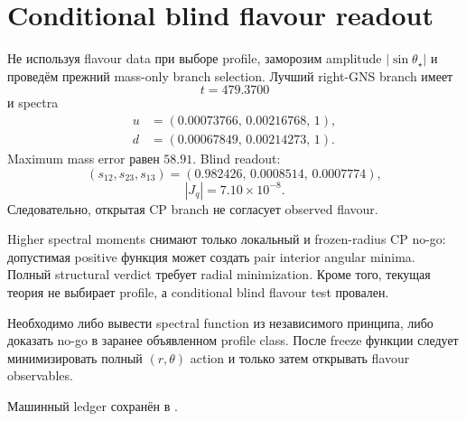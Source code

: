 \section{Conditional blind flavour readout}

Не используя flavour data при выборе profile, заморозим amplitude
$|\sin\theta_\star|$ и проведём прежний mass-only branch selection. Лучший
right-GNS branch имеет
\begin{equation}
 t=479.3700
\end{equation}
и spectra
\begin{align}
 u&=(0.00073766,\,0.00216768,\,1),\\
 d&=(0.00067849,\,0.00214273,\,1).
\end{align}
Maximum mass error равен $58.91$. Blind readout:
\begin{equation}
 (s_{12},s_{23},s_{13})
 =(0.982426,\,0.0008514,\,0.0007774),
\end{equation}
\begin{equation}
 |J_q|=7.10\times10^{-8}.
\end{equation}
Следовательно, открытая CP branch не согласует observed flavour.

\begin{theorem}
Higher spectral moments снимают только локальный и frozen-radius CP no-go:
допустимая positive функция может создать pair interior angular minima.
Полный structural verdict требует radial minimization. Кроме того, текущая
теория не выбирает profile, а conditional blind flavour test провален.
\end{theorem}

\begin{protocol}
Необходимо либо вывести spectral function из независимого принципа, либо
доказать no-go в заранее объявленном profile class. После freeze функции
следует минимизировать полный $(r,\theta)$ action и только затем открывать
flavour observables.
\end{protocol}

Машинный ledger сохранён в
.